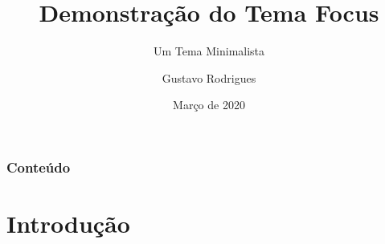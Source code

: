 \documentclass[aspectratio=169]{beamer}
\title{Demonstração do Tema Focus}
\subtitle{Um Tema Minimalista}
\author{Gustavo Rodrigues}
\institute{Universidade Federal de Uberlândia}
\date{Março de 2020}
\begin{document}
\begin{frame}
	\maketitle
\end{frame}
\begin{frame}
	\frametitle{Conteúdo} 
	\tableofcontents 
\end{frame}
\section{Introdução}
\begin{frame}{}
	\sectionpage
\end{frame}
\end{document}
